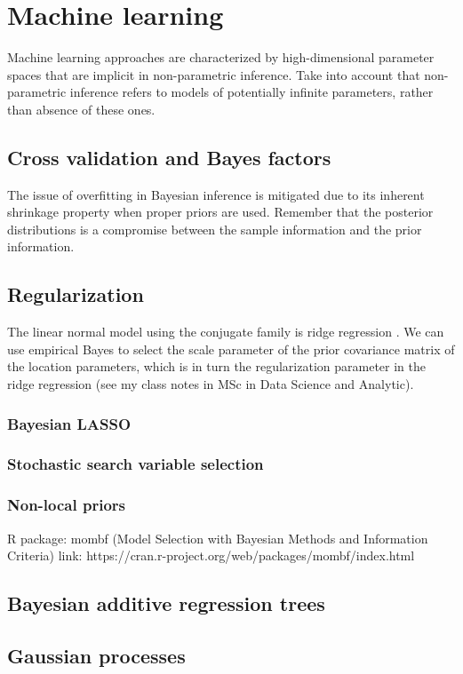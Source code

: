 \chapter{Machine learning}\label{chap13}

Machine learning approaches are characterized by high-dimensional parameter spaces that are implicit in non-parametric inference. Take into account that non-parametric inference refers to models of potentially infinite parameters, rather than absence of these ones.

\section{Cross validation and Bayes factors}\label{sec13_1}
The issue of overfitting in Bayesian inference is mitigated due to its inherent shrinkage property when proper priors are used. Remember that the posterior distributions is a compromise between the sample information and the prior information.

\section{Regularization}\label{sec13_2}
The linear normal model using the conjugate family is ridge regression \cite{Ishwaran2005}. We can use empirical Bayes to select the scale parameter of the prior covariance matrix of the location parameters, which is in turn the regularization parameter in the ridge regression (see my class notes in MSc in Data Science and Analytic).

\subsection{Bayesian LASSO}\label{sec13_21}

\subsection{Stochastic search variable selection}\label{sec13_22}

\subsection{Non-local priors}\label{sec13_23}

\cite{johnson2012bayesian}
R package: mombf (Model Selection with Bayesian Methods and Information Criteria)
link: https://cran.r-project.org/web/packages/mombf/index.html

\section{Bayesian additive regression trees}\label{sec13_3}

\section{Gaussian processes}\label{13_4}